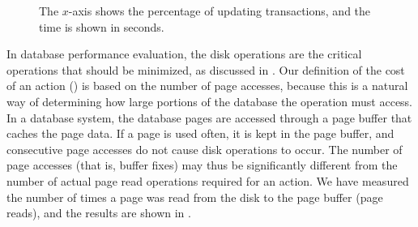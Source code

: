 \begin{figure}[!htb]
\begin{center}
%
{The $x$-axis shows the percentage of updating transactions, and the time is
shown in seconds.}
\label{fig:qu-initial-time}
\end{center}
\end{figure}

In database performance evaluation, the disk  operations are the
critical operations that should be minimized, as discussed in
.
Our definition of the cost of an action () is based
on the number of page accesses, because this is a natural way of determining
how large portions of the database the operation must access.
In a database system, the database pages are accessed through a page buffer
that caches the page data. 
If a page is used often, it is kept in the page buffer, and consecutive
page accesses do not cause disk  operations to occur.
The number of page accesses (that is, buffer fixes) may thus be significantly
different from the number of actual page read operations required for an
action. 
We have measured the number of times a page was read from the disk to the
page buffer (page reads), and the results are shown in
.

